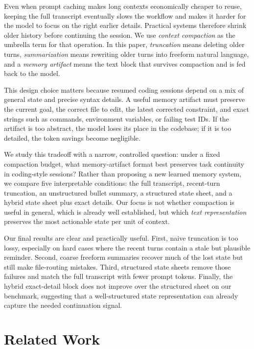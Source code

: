 \documentclass[11pt]{article}
\begin{document}
Even when prompt caching makes long contexts economically cheaper to reuse, keeping the full transcript eventually slows the workflow and makes it harder for the model to focus on the right earlier details. Practical systems therefore shrink older history before continuing the session. We use \emph{context compaction} as the umbrella term for that operation. In this paper, \emph{truncation} means deleting older turns, \emph{summarization} means rewriting older turns into freeform natural language, and a \emph{memory artifact} means the text block that survives compaction and is fed back to the model.

This design choice matters because resumed coding sessions depend on a mix of general state and precise syntax details. A useful memory artifact must preserve the current goal, the correct file to edit, the latest corrected constraint, and exact strings such as commands, environment variables, or failing test IDs. If the artifact is too abstract, the model loses its place in the codebase; if it is too detailed, the token savings become negligible.

We study this tradeoff with a narrow, controlled question: under a fixed compaction budget, what memory-artifact format best preserves task continuity in coding-style sessions? Rather than proposing a new learned memory system, we compare five interpretable conditions: the full transcript, recent-turn truncation, an unstructured bullet summary, a structured state sheet, and a hybrid state sheet plus exact details. Our focus is not whether compaction is useful in general, which is already well established, but which \emph{text representation} preserves the most actionable state per unit of context.

Our final results are clear and practically useful. First, naive truncation is too lossy, especially on hard cases where the recent turns contain a stale but plausible reminder. Second, coarse freeform summaries recover much of the lost state but still make file-routing mistakes. Third, structured state sheets remove those failures and match the full transcript with fewer prompt tokens. Finally, the hybrid exact-detail block does not improve over the structured sheet on our benchmark, suggesting that a well-structured state representation can already capture the needed continuation signal.

\section{Related Work}
\end{document}
